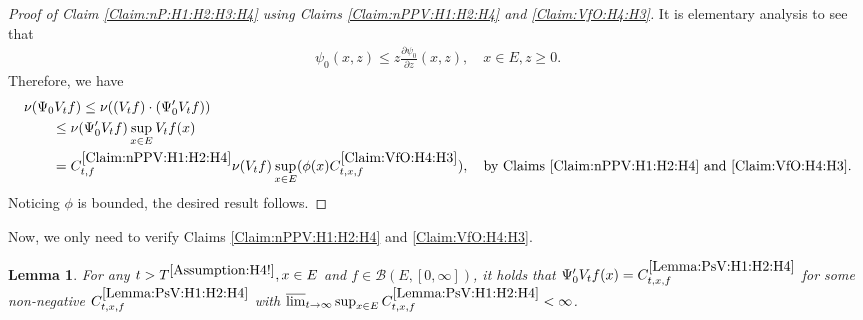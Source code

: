 \documentclass[12pt,a4paper]{amsart}
\numberwithin{equation}{section}
\theoremstyle{plain}
\newtheorem{lem}[thm]{Lemma}
\theoremstyle{definition}
\theoremstyle{remark}
\newcounter{N}
\newcounter{n}[N]
\begin{document}
\begin{proof}[{Proof of Claim \ref{Claim:nP:H1:H2:H3:H4} using Claims \ref{Claim:nPPV:H1:H2:H4} and \ref{Claim:VfO:H4:H3}}] 
It is elementary analysis to see that 
\begin{align}
  \psi_0(x,z) 
  \leq z \frac{\partial \psi_0}{\partial z}(x,z),
  \quad x\in E, z\geq 0.
  \end{align}
Therefore, we have
\begin{align}
  \MoveEqLeft \nu(\Psi_0 V_tf) 
\leq \nu((V_tf)\cdot (\Psi_0' V_tf))
\\&  \leq  \nu(\Psi_0' V_tf) \sup_{x\in E}V_tf(x)
 \\& =   C^{\ref{Claim:nPPV:H1:H2:H4}}_{t,f} \nu(V_tf) \sup_{x\in E} (\phi(x) C^{\ref{Claim:VfO:H4:H3}}_{t,x,f}),\quad\text{by Claims \ref{Claim:nPPV:H1:H2:H4} and \ref{Claim:VfO:H4:H3}}.
  \end{align}
Noticing $\phi$ is bounded, the desired result follows.
\end{proof}
	
	Now, we only need to verify Claims \ref{Claim:nPPV:H1:H2:H4} and \ref{Claim:VfO:H4:H3}.

\begin{lem} \label{Lemma:PsV:H1:H2:H4} 
	For any $t> T^{\ref{Assumption:H4!}}, x\in E$ and $f\in \mathcal B(E,[0,\infty])$, it holds that $\Psi_0'V_tf(x) = C^{\ref{Lemma:PsV:H1:H2:H4}}_{t,x,f}$ for some non-negative $C^{\ref{Lemma:PsV:H1:H2:H4}}_{t,x,f}$ with
$\varlimsup_{t\to \infty} \sup_{x\in E} C^{\ref{Lemma:PsV:H1:H2:H4}}_{t,x,f} <\infty$.
\end{lem}
\end{document}
